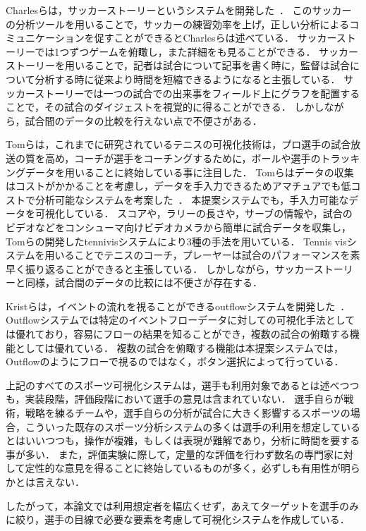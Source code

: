 \documentclass[sotsuron]{kuee}
\begin{document}
	Charlesらは，サッカーストーリーというシステムを開発した~\cite{SoccerStory}． 
	このサッカーの分析ツールを用いることで，サッカーの練習効率を上げ，正しい分析によるコミュニケーションを促すことができるとCharlesらは述べている． 
	サッカーストーリーでは1つずつゲームを俯瞰し，また詳細をも見ることができる． 
	サッカーストーリーを用いることで，記者は試合について記事を書く時に，監督は試合について分析する時に従来より時間を短縮できるようになると主張している． 
	サッカーストーリーでは一つの試合での出来事をフィールド上にグラフを配置することで，その試合のダイジェストを視覚的に得ることができる． 
	しかしながら，試合間のデータの比較を行えない点で不便さがある． 
	
	Tomらは，これまでに研究されているテニスの可視化技術は，プロ選手の試合放送の質を高め，コーチが選手をコーチングするために，ボールや選手のトラッキングデータを用いることに終始している事に注目した． 
	Tomらはデータの収集はコストがかかることを考慮し，データを手入力できるためアマチュアでも低コストで分析可能なシステムを考案した~\cite{TenniVis}． 
	本提案システムでも，手入力可能なデータを可視化している． 
	スコアや，ラリーの長さや，サーブの情報や，試合のビデオなどをコンシューマ向けビデオカメラから簡単に試合データを収集し，Tomらの開発したtennivisシステムにより3種の手法を用いている． 
	Tennis visシステムを用いることでテニスのコーチ，プレーヤーは試合のパフォーマンスを素早く振り返ることができると主張している． 
	しかしながら，サッカーストーリーと同様，試合間のデータの比較には不便さが存在する． 
	
	Kristらは，イベントの流れを視ることができるoutflowシステムを開発した~\cite{Outflow}． 
	Outflowシステムでは特定のイベントフローデータに対しての可視化手法としては優れており，容易にフローの結果を知ることができ，複数の試合の俯瞰する機能としては優れている． 
	複数の試合を俯瞰する機能は本提案システムでは，Outflowのようにフローで視るのではなく，ボタン選択によって行っている． 	
	
	上記のすべてのスポーツ可視化システムは，選手も利用対象であるとは述べつつも，実装段階，評価段階において選手の意見は含まれていない． 
	選手自らが戦術，戦略を練るチームや，選手自らの分析が試合に大きく影響するスポーツの場合，こういった既存のスポーツ分析システムの多くは選手の利用を想定しているとはいいつつも，操作が複雑，もしくは表現が難解であり，分析に時間を要する事が多い． 
	また，評価実験に際して，定量的な評価を行わず数名の専門家に対して定性的な意見を得ることに終始しているものが多く，必ずしも有用性が明らかとは言えない． 
	
	したがって，本論文では利用想定者を幅広くせず，あえてターゲットを選手のみに絞り，選手の目線で必要な要素を考慮して可視化システムを作成している． 
	
\end{document}
